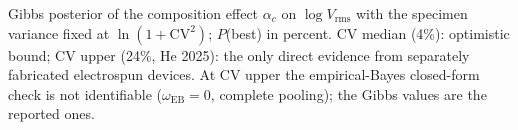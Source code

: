 Gibbs posterior of the composition effect $\alpha_c$ on $\log V_\mathrm{rms}$ with the specimen variance fixed at $\ln(1 + \mathrm{CV}^2)$; $P$(best) in percent. CV median (4\%): optimistic bound; CV upper (24\%, He 2025): the only direct evidence from separately fabricated electrospun devices. At CV upper the empirical-Bayes closed-form check is not identifiable ($\omega_\mathrm{EB} = 0$, complete pooling); the Gibbs values are the reported ones.
